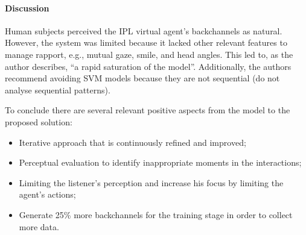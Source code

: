 \paragraph{\textbf{Discussion}}

Human subjects perceived the \ac{IPL} virtual agent's backchannels as natural. However, the system was limited because it lacked other relevant features to manage rapport, e.g., mutual gaze, smile, and head angles. This led to, as the author describes, ``a rapid saturation of the model''. Additionally, the authors recommend avoiding \ac{SVM} models because they are not sequential (do not analyse sequential patterns).
 
To conclude there are several relevant positive aspects from the model to the proposed solution:
\begin{itemize}
	\item Iterative approach that is continuously refined and improved;
	\item Perceptual evaluation to identify inappropriate moments in the interactions;
	\item Limiting the listener's perception and increase his focus by limiting the agent's actions;
	\item Generate 25\% more backchannels for the training stage in order to collect more data.
\end{itemize}
